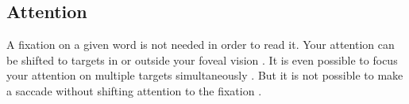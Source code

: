 \subsection{Attention}
A fixation on a given word is not needed in order to read it. Your attention can be shifted to targets in or outside your foveal vision \cite{eyeMovement}. It is even possible to focus your attention on multiple targets simultaneously \cite{simAttention}. But it is not possible to make a saccade without shifting attention to the fixation \cite{eyeMovement}.
